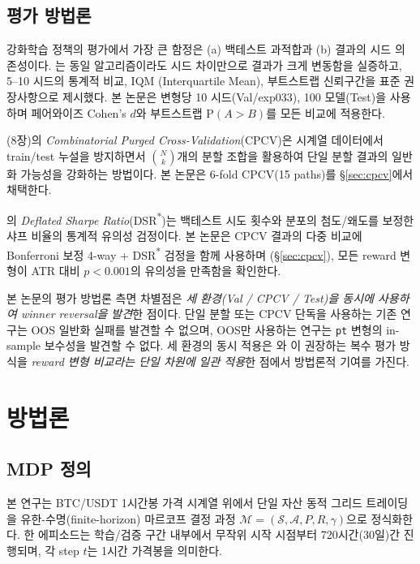 \documentclass[11pt, a4paper]{article}
\begin{document}
\subsection{평가 방법론}
\label{sec:related_eval}

강화학습 정책의 평가에서 가장 큰 함정은 (a) 백테스트 과적합과 (b) 결과의
시드 의존성이다. \citet{henderson2018rlreproducibility}는 동일 알고리즘이라도
시드 차이만으로 결과가 크게 변동함을 실증하고, 5--10 시드의 통계적 비교, IQM
(Interquartile Mean), 부트스트랩 신뢰구간을 표준 권장사항으로 제시했다. 본
논문은 변형당 10 시드(Val/exp033), 100 모델(Test)을 사용하며 페어와이즈
Cohen's $d$와 부트스트랩 $\mathrm{P}(A>B)$를 모든 비교에 적용한다.

\citet{lopezdeprado2018advances} (8장)의 \emph{Combinatorial Purged
Cross-Validation}(CPCV)은 시계열 데이터에서 train/test 누설을 방지하면서
$\binom{N}{k}$개의 분할 조합을 활용하여 단일 분할 결과의 일반화 가능성을
강화하는 방법이다. 본 논문은 6-fold CPCV(15 paths)를 §\ref{sec:cpcv}에서 채택한다.

\citet{lopezdeprado2014dsr}의 \emph{Deflated Sharpe Ratio}(DSR\textsuperscript{*})는
백테스트 시도 횟수와 분포의 첨도/왜도를 보정한 샤프 비율의 통계적 유의성
검정이다. 본 논문은 CPCV 결과의 다중 비교에 Bonferroni 보정 4-way + DSR\textsuperscript{*}
검정을 함께 사용하며 (§\ref{sec:cpcv}), 모든 reward 변형이 ATR 대비 $p<0.001$의
유의성을 만족함을 확인한다.

본 논문의 평가 방법론 측면 차별점은 \emph{세 환경(Val / CPCV / Test)을 동시에
사용하여 winner reversal을 발견}한 점이다. 단일 분할 또는 CPCV 단독을 사용하는
기존 연구는 OOS 일반화 실패를 발견할 수 없으며, OOS만 사용하는 연구는 \texttt{pt}
변형의 in-sample 보수성을 발견할 수 없다. 세 환경의 동시 적용은
\citet{henderson2018rlreproducibility}와 \citet{gort2022backtest}이 권장하는
복수 평가 방식을 \emph{reward 변형 비교라는 단일 차원에 일관 적용}한 점에서
방법론적 기여를 가진다.

\section{방법론}
\label{sec:method}

\subsection{MDP 정의}
\label{sec:mdp}

본 연구는 BTC/USDT 1시간봉 가격 시계열 위에서 단일 자산 동적 그리드 트레이딩을
유한-수명(finite-horizon) 마르코프 결정 과정 $\mathcal{M} = (\mathcal{S},
\mathcal{A}, P, R, \gamma)$으로 정식화한다. 한 에피소드는 학습/검증 구간 내부에서
무작위 시작 시점부터 720시간(30일)간 진행되며, 각 step $t$는 1시간 가격봉을 의미한다.
\end{document}
